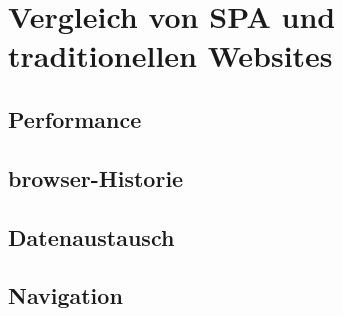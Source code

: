 \section{Vergleich von \ac{SPA} und traditionellen Websites}
\subsection{Performance}
\subsection{\gls{browser}-Historie}
\subsection{Datenaustausch}
\subsection{Navigation}